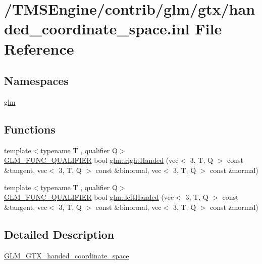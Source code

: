 \hypertarget{handed__coordinate__space_8inl}{}\section{/\+T\+M\+S\+Engine/contrib/glm/gtx/handed\+\_\+coordinate\+\_\+space.inl File Reference}
\label{handed__coordinate__space_8inl}
\subsection*{Namespaces}
\begin{DoxyCompactItemize}
\item 
 \hyperlink{namespaceglm}{glm}
\end{DoxyCompactItemize}
\subsection*{Functions}
\begin{DoxyCompactItemize}
\item 
{\footnotesize template$<$typename T , qualifier Q$>$ }\\\hyperlink{setup_8hpp_a33fdea6f91c5f834105f7415e2a64407}{G\+L\+M\+\_\+\+F\+U\+N\+C\+\_\+\+Q\+U\+A\+L\+I\+F\+I\+ER} bool \hyperlink{group__gtx__handed__coordinate__space_ga99386a5ab5491871b947076e21699cc8}{glm\+::right\+Handed} (vec$<$ 3, T, Q $>$ const \&tangent, vec$<$ 3, T, Q $>$ const \&binormal, vec$<$ 3, T, Q $>$ const \&normal)
\item 
{\footnotesize template$<$typename T , qualifier Q$>$ }\\\hyperlink{setup_8hpp_a33fdea6f91c5f834105f7415e2a64407}{G\+L\+M\+\_\+\+F\+U\+N\+C\+\_\+\+Q\+U\+A\+L\+I\+F\+I\+ER} bool \hyperlink{group__gtx__handed__coordinate__space_ga6f1bad193b9a3b048543d1935cf04dd3}{glm\+::left\+Handed} (vec$<$ 3, T, Q $>$ const \&tangent, vec$<$ 3, T, Q $>$ const \&binormal, vec$<$ 3, T, Q $>$ const \&normal)
\end{DoxyCompactItemize}


\subsection{Detailed Description}
\hyperlink{group__gtx__handed__coordinate__space}{G\+L\+M\+\_\+\+G\+T\+X\+\_\+handed\+\_\+coordinate\+\_\+space} 